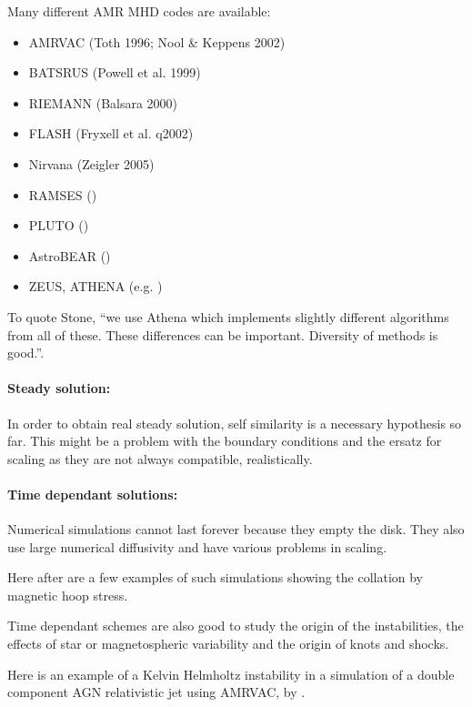 \documentclass[10pt,a4paper,english]{article}
\begin{document}
Many different AMR MHD codes are available:
\begin{itemize}
    \item AMRVAC (Toth 1996; Nool \& Keppens 2002)
    \item BATSRUS (Powell et al. 1999)
    \item RIEMANN (Balsara 2000)
    \item FLASH (Fryxell et al. q2002)
    \item Nirvana (Zeigler 2005)
    \item RAMSES (\cite{2006A&A...457..371F})
    \item PLUTO (\cite{2006MNRAS.368.1040M})
    \item AstroBEAR (\cite{2008PhDT.........2C})
    \item ZEUS, ATHENA (e.g. \cite{1990IAUS..140..351S})
\end{itemize}

To quote Stone, ``we use Athena which implements slightly different algorithms
from all of these. These differences can be important. Diversity of methods is
good.''.

\paragraph{Steady solution:}

In order to obtain real steady solution, self similarity is a necessary
hypothesis so far. This might be a problem with the boundary conditions and the
ersatz for scaling as they are not always compatible, realistically.

\paragraph{Time dependant solutions:}

Numerical simulations cannot last forever because they empty the disk. They
also use large numerical diffusivity and have various problems in scaling.

Here after are a few examples of such simulations showing the collation by
magnetic hoop stress.

Time dependant schemes are also good to study the origin of the instabilities,
the effects of star or magnetospheric variability and the origin of knots and
shocks.


Here is an example of a Kelvin Helmholtz instability in a simulation of a
double component AGN relativistic jet using AMRVAC, by
\cite{2009ApJ...705.1594M}.
\end{document}
